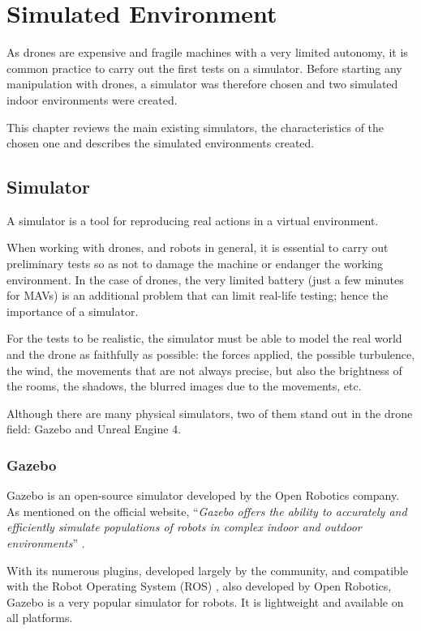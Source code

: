 \chapter{Simulated Environment}\label{ch:simulated.environment}

As drones are expensive and fragile machines with a very limited autonomy, it is common practice to carry out the first tests on a simulator. Before starting any manipulation with drones, a simulator was therefore chosen and two simulated indoor environments were created.

This chapter reviews the main existing simulators, the characteristics of the chosen one and describes the simulated environments created.

\section{Simulator}

A simulator is a tool for reproducing real actions in a virtual environment.

When working with drones, and robots in general, it is essential to carry out preliminary tests so as not to damage the machine or endanger the working environment. In the case of drones, the very limited battery (just a few minutes for MAVs) is an additional problem that can limit real-life testing; hence the importance of a simulator.

For the tests to be realistic, the simulator must be able to model the real world and the drone as faithfully as possible: the forces applied, the possible turbulence, the wind, the movements that are not always precise, but also the brightness of the rooms, the shadows, the blurred images due to the movements, etc.

Although there are many physical simulators, two of them stand out in the drone field: Gazebo and Unreal Engine 4.

\subsection{Gazebo}

Gazebo \cite{gazebo2021website} is an open-source simulator developed by the Open Robotics \cite{openrobotics2021website} company. As mentioned on the official website, \enquote{\textit{Gazebo offers the ability to accurately and efficiently simulate populations of robots in complex indoor and outdoor environments}} \cite{gazebo2021website}.

With its numerous plugins, developed largely by the community, and compatible with the Robot Operating System (ROS) \cite{ros2021website}, also developed by Open Robotics, Gazebo is a very popular simulator for robots. It is lightweight and available on all platforms.

